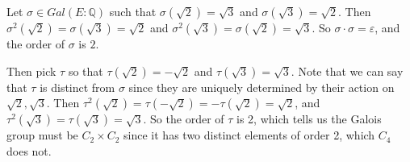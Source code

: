 \documentclass{article}
\begin{document}
\begin{enumerate}
    Let $\sigma \in Gal(E:\mathbb{Q})$ such that $\sigma(\sqrt{2})=\sqrt{3}$ and 
    $\sigma(\sqrt{3} )=\sqrt{2} $. Then $\sigma^2(\sqrt{2} ) =\sigma(\sqrt{3})=\sqrt{2}$
    and $\sigma^2(\sqrt{3} )=\sigma(\sqrt{2} )=\sqrt{3} $. So $\sigma\cdot \sigma=\varepsilon$, and
    the order of $\sigma$ is $2$.

    Then pick $\tau$ so that $\tau(\sqrt{2})=-\sqrt{2} $ and $\tau(\sqrt{3})=\sqrt{3} $. Note that we
    can say that $\tau$ is distinct from $\sigma$ since they are uniquely determined by their action
    on $\sqrt{2} ,\sqrt{3} $. Then $\tau^2(\sqrt{2})=\tau(-\sqrt{2} ) =-\tau(\sqrt{2} )=\sqrt{2} $, and 
    $\tau^2(\sqrt{3})=\tau(\sqrt{3} )=\sqrt{3} $. So the order of $\tau$ is 2, which tells us the Galois
    group must be $C_2\times C_2$ since it has two distinct elements of order 2, which $C_4$ does not.

\end{enumerate}
\end{document}
